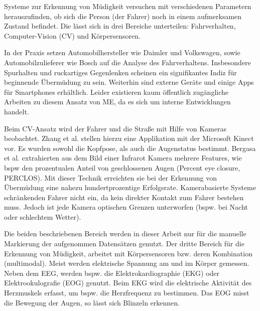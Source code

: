 \label{chap:state}
Systeme zur Erkennung von Müdigkeit versuchen mit verschiedenen Parametern herauszufinden, ob sich die Person (der Fahrer) noch in einem aufmerksamen Zustand befindet. Die lässt sich in drei Bereiche unterteilen: Fahrverhalten, Computer-Vision (CV) und Körpersensoren. 

In der Praxis setzen Automobilhersteller wie Daimler\cite{Daimler} und Volkswagen, sowie Automobilzulieferer wie Bosch\cite{Bosch} auf die Analyse des Fahrverhaltens. Insbesondere Spurhalten und ruckartiges Gegenlenken scheinen ein signifikantes Indiz für beginnende Übermüdung zu sein. Weiterhin sind externe Geräte und einige Apps für Smartphones erhältlich. Leider existieren kaum öffentlich zugängliche Arbeiten zu diesem Ansatz von  \acl{ME}, da es sich um interne Entwicklungen handelt. 

Beim CV-Ansatz wird der Fahrer und die Straße mit Hilfe von Kameras beobachtet. Zhang et al. \cite{Zhang:2015:RSD:2753829.2629482} stellen hierzu eine Applikation mit der Microsoft Kinect vor. Es wurden sowohl die Kopfpose, als auch die Augenstatus bestimmt. Bergasa et al. \cite{Bergasa_1603553} extrahierten aus dem Bild einer Infrarot Kamera mehrere Features, wie \acl{bspw} den prozentualen Anteil von geschlossenen Augen (Percent eye closure, PERCLOS). Mit dieser Technik erreichten sie bei der Erkennung von Übermüdung eine nahezu hundertprozentige Erfolgsrate. Kamerabasierte Systeme schränkenden Fahrer nicht ein, da kein direkter Kontakt zum Fahrer bestehen muss. Jedoch ist jede Kamera optischen Grenzen unterworfen (bspw. bei Nacht oder schlechtem Wetter).

Die beiden beschriebenen Bereich werden in dieser Arbeit nur für die manuelle Markierung der aufgenommen Datensätzen genutzt. Der dritte Bereich für die Erkennung von Müdigkeit, arbeitet mit Körpersensoren bzw. deren Kombination (multimodal). Meist werden elektrische Spannung am und im Körper gemessen. Neben dem EEG, werden bspw. die Elektrokardiographie (EKG) oder Elektrookulografie (EOG) genutzt. Beim EKG wird die elektrische Aktivität des Herzmuskels erfasst, um bspw. die  Herzfrequenz zu bestimmen. Das EOG misst die Bewegung der Augen, so lässt sich Blinzeln erkennen.

